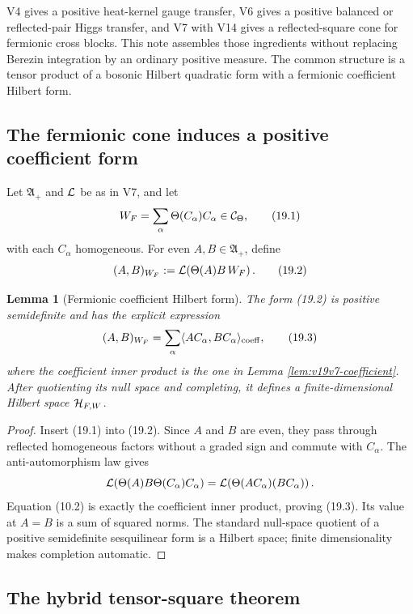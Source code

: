 \documentclass[11pt]{article}
\newtheorem{lemma}[theorem]{Lemma}
\theoremstyle{remark}
\begin{document}
V4 gives a positive heat-kernel gauge transfer, V6 gives a positive
balanced or reflected-pair Higgs transfer, and V7 with V14 gives a
reflected-square cone for fermionic cross blocks.  This note assembles
those ingredients without replacing Berezin integration by an ordinary
positive measure.  The common structure is a tensor product of a bosonic
Hilbert quadratic form with a fermionic coefficient Hilbert form.

\subsection{The fermionic cone induces a positive coefficient form}

Let \({\mathfrak A}_+\) and \({\cal L}\) be as in V7, and let
\[
 W_F=\sum_{\alpha}\Theta(C_\alpha)C_\alpha
 \in{\cal C}_\Theta,                                           \tag{19.1}
\]
with each \(C_\alpha\) homogeneous.  For even
\(A,B\in{\mathfrak A}_+\), define
\[
 (A,B)_{W_F}:={\cal L}\!\left(\Theta(A)B\,W_F\right).           \tag{19.2}
\]

\begin{lemma}[Fermionic coefficient Hilbert form]
\label{lem:v19v16-fermion-form}
The form (19.2) is positive semidefinite and has the explicit expression
\[
 (A,B)_{W_F}
 =\sum_\alpha\langle AC_\alpha,BC_\alpha\rangle_{\rm coeff},   \tag{19.3}
\]
where the coefficient inner product is the one in Lemma
\ref{lem:v19v7-coefficient}.  After quotienting its null space and
completing, it defines a finite-dimensional Hilbert space
\({\cal H}_{F,W}\).
\end{lemma}

\begin{proof}
Insert (19.1) into (19.2).  Since \(A\) and \(B\) are even, they pass
through reflected homogeneous factors without a graded sign and commute
with \(C_\alpha\).  The anti-automorphism law gives
\[
 {\cal L}\!\left(\Theta(A)B\Theta(C_\alpha)C_\alpha\right)
 ={\cal L}\!\left(\Theta(AC_\alpha)(BC_\alpha)\right).
\]
Equation (10.2) is exactly the coefficient inner product, proving (19.3).
Its value at \(A=B\) is a sum of squared norms.  The standard null-space
quotient of a positive semidefinite sesquilinear form is a Hilbert space;
finite dimensionality makes completion automatic.
\end{proof}

\subsection{The hybrid tensor-square theorem}
\end{document}
